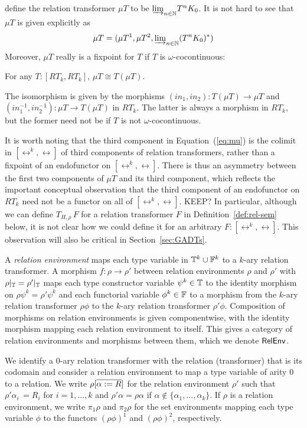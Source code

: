 \documentclass{lmcs}
\theoremstyle{plain}\newtheorem{satz}[thm]{Satz}
\begin{document}
define the relation transformer $\mu T$ to be ${{\underrightarrow{\lim}}_{n \in \mathbb{N}}{T^n
  K_0}}$. It is not hard to see that $\mu T$ is given explicitly as
\begin{equation}\label{eq:mu}
\mu T = (\mu T^1,\mu T^2, {{\underrightarrow{\lim}}_{n \in \mathbb{N}}{(T^nK_0)^*}})
\end{equation}
Moreover, $\mu T$ really is a fixpoint for $T$ if $T$ is
$\omega$-cocontinuous:
\begin{lem}\label{lem:fp}
For any $T : [RT_k,RT_k]$, $\mu T \cong T(\mu T)$.
\end{lem}
\noindent
The isomorphism is given by the morphisms $(\mathit{in}_1,
\mathit{in}_2) : T(\mu T) \to \mu T$ and $(in_1^{-1}, in_2^{-1}) : \mu
T \to T(\mu T)$ in $RT_k$. The latter is always a morphism in $RT_k$,
but the former need not be if $T$ is not $\omega$-cocontinuous.

It is worth noting that the third component in Equation~(\ref{eq:mu})
is the colimit in $[\rel^k,\rel]$ of third components of relation
transformers, rather than a fixpoint of an endofunctor on
$[\rel^k,\rel]$. There is thus an asymmetry between the first two
components of $\mu T$ and its third component, which reflects the
important conceptual observation that the third component of an
endofunctor on $RT_k$ need not be a functor on all of
$[\rel^k,\rel]$. {\color{red} KEEP? In particular, although we can
  define $T_{H,\rho}\, F$ for a relation transformer $F$ in
  Definition~\ref{def:rel-sem} below, it is not clear how we could
  define it for an arbitrary $F : [\rel^k,\rel]$. This observation
  will also be critical in Section~\ref{sec:GADTs}.}

\begin{defi}\label{def:reln-env}
A {\em relation environment} maps each type variable in $\mathbb{T}^k \cup
\mathbb{F}^k$ to a $k$-ary relation transformer.  A morphism $f : \rho \to
\rho'$ between relation environments $\rho$ and $\rho'$ with
$\rho|_{\mathbb{T}} = \rho'|_{\mathbb{T}}$ maps each type constructor variable
$\psi^k \in \mathbb{T}$ to the identity morphism on $\rho \psi^k = \rho'
\psi^k$ and each functorial variable $\phi^k \in \mathbb{F}$ to a morphism
from the $k$-ary relation transformer $\rho \phi$ to the $k$-ary
relation transformer $\rho' \phi$. Composition of morphisms on
relation environments is given componentwise, with the identity
morphism mapping each relation environment to itself. This gives a
category of relation environments and morphisms between them, which we
denote $\mathsf{RelEnv}$.
\end{defi}
We identify a $0$-ary relation transformer with the relation
(transformer) that is its codomain and consider a relation environment
to map a type variable of arity $0$ to a relation.  We write
$\rho[\overline{\alpha := R}]$ for the relation environment $\rho'$ such
that $\rho' \alpha_i \, = R_i$ for $i = 1,...,k$ and $\rho' \alpha =
\rho\alpha$ if $\alpha \not \in \{\alpha_1,...,\alpha_k\}$.  If $\rho$
is a relation environment, we write $\pi_1 \rho$ and $\pi_2 \rho$ for
the set environments mapping each type variable $\phi$ to the functors
$(\rho\phi)^1$ and $(\rho\phi)^2$, respectively.
\end{document}
